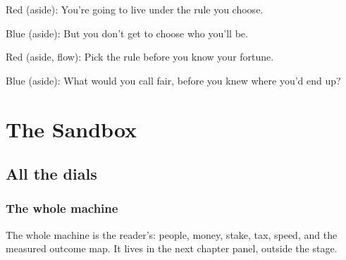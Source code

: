 Red (aside): You're going to live under the rule you choose.

Blue (aside): But you don't get to choose who you'll be.

Red (aside, flow): Pick the rule before you know your fortune.

Blue (aside): What would you call fair, before you knew where you'd end up?

\chapter{The Sandbox}\label{chapter:sandbox}

\section{All the dials}\label{index:all-the-dials}

\subsection{The whole machine}\label{act:sandbox-lab}

\label{sandbox-lab}

The whole machine is the reader's: people, money, stake, tax, speed, and the
measured outcome map. It lives in the next chapter panel, outside the stage.
